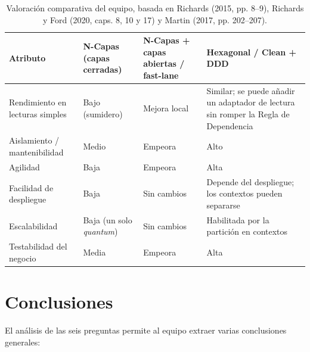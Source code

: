 \documentclass[11pt,a4paper]{article}
\begin{document}
\begin{table}[htbp]
\centering
\small
\renewcommand{\arraystretch}{1.3}
\begin{tabularx}{\textwidth}{>{\raggedright\arraybackslash}p{2.6cm} >{\raggedright\arraybackslash}X >{\raggedright\arraybackslash}X >{\raggedright\arraybackslash}X}
\toprule
\textbf{Atributo} & \textbf{N-Capas (capas cerradas)} & \textbf{N-Capas + capas abiertas / fast-lane} & \textbf{Hexagonal / Clean + DDD} \\
\midrule
Rendimiento en lecturas simples & Bajo (sumidero) & Mejora local & Similar; se puede añadir un adaptador de lectura sin romper la Regla de Dependencia \\
Aislamiento / mantenibilidad & Medio & Empeora & Alto \\
Agilidad & Baja & Empeora & Alta \\
Facilidad de despliegue & Baja & Sin cambios & Depende del despliegue; los contextos pueden separarse \\
Escalabilidad & Baja (un solo \emph{quantum}) & Sin cambios & Habilitada por la partición en contextos \\
Testabilidad del negocio & Media & Empeora & Alta \\
\bottomrule
\end{tabularx}
\caption{Valoración comparativa del equipo, basada en Richards (2015, pp. 8--9), Richards y Ford (2020, caps. 8, 10 y 17) y Martin (2017, pp. 202--207).}
\end{table}

\section{Conclusiones}

El análisis de las seis preguntas permite al equipo extraer varias conclusiones generales:
\end{document}
